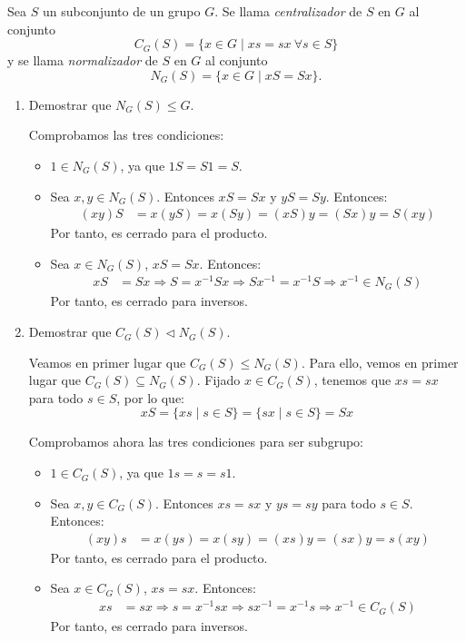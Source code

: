 \begin{ejercicio}
    Sea $S$ un subconjunto de un grupo $G$. Se llama \emph{centralizador} de $S$ en $G$ al conjunto
    \[
        C_G(S) = \{x\in G\mid xs=sx\ \forall s\in S\}
    \]
    y se llama \emph{normalizador} de $S$ en $G$ al conjunto
    \[
        N_G(S) = \{x\in G\mid xS=Sx\}.
    \]
    \begin{enumerate}
        \item Demostrar que $N_G(S)\leq G$.
        
        Comprobamos las tres condiciones:
        \begin{itemize}
            \item $1\in N_G(S)$, ya que $1S=S1=S$.
            \item Sea $x,y\in N_G(S)$. Entonces $xS=Sx$ y $yS=Sy$. Entonces:
                \begin{align*}
                    (xy)S &= x(yS) = x(Sy) = (xS)y = (Sx)y = S(xy)
                \end{align*}
                Por tanto, es cerrado para el producto.
            \item Sea $x\in N_G(S)$, $xS=Sx$. Entonces:
                \begin{align*}
                    xS &= Sx \Longrightarrow S = x^{-1}Sx \Longrightarrow Sx^{-1} = x^{-1}S \Longrightarrow x^{-1}\in N_G(S)
                \end{align*}
                Por tanto, es cerrado para inversos.
        \end{itemize}
        \item Demostrar que $C_G(S)\lhd N_G(S)$.
        
        Veamos en primer lugar que $C_G(S)\leq N_G(S)$. Para ello, vemos en primer lugar que $C_G(S)\subseteq N_G(S)$. Fijado $x\in C_G(S)$, tenemos que $xs=sx$ para todo $s\in S$, por lo que:
        \begin{equation*}
            xS = \{xs\mid s\in S\} = \{sx\mid s\in S\} = Sx
        \end{equation*}
        
        Comprobamos ahora las tres condiciones para ser subgrupo:
        \begin{itemize}
            \item $1\in C_G(S)$, ya que $1s=s=s1$.
            \item Sea $x,y\in C_G(S)$. Entonces $xs=sx$ y $ys=sy$ para todo $s\in S$. Entonces:
                \begin{align*}
                    (xy)s &= x(ys) = x(sy) = (xs)y = (sx)y = s(xy)
                \end{align*}
                Por tanto, es cerrado para el producto.
            \item Sea $x\in C_G(S)$, $xs=sx$. Entonces:
                \begin{align*}
                    xs &= sx \Longrightarrow s = x^{-1}sx \Longrightarrow sx^{-1} = x^{-1}s \Longrightarrow x^{-1}\in C_G(S)
                \end{align*}
                Por tanto, es cerrado para inversos.
        \end{itemize}


\end{enumerate}
\end{ejercicio}
